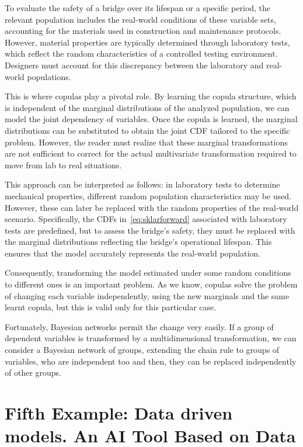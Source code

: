 \documentclass[
	11pt, %
	fleqn, %
	a4paper, %
]{LegrandOrangeBook}
\begin{document}
To evaluate the safety of a bridge over its lifespan or a specific period, the relevant population includes the real-world conditions of these variable sets, accounting for the materials used in construction and maintenance protocols. However, material properties are typically determined through laboratory tests, which reflect the random characteristics of a controlled testing environment. Designers must account for this discrepancy between the laboratory and real-world populations.

This is where copulas play a pivotal role. By learning the copula structure, which is independent of the marginal distributions of the analyzed population, we can model the joint dependency of variables. Once the copula is learned, the marginal distributions can be substituted to obtain the joint CDF tailored to the specific problem. However, the reader must realize that these marginal transformations are not sufficient to correct for the actual multivariate transformation required to move from lab to real situations.

This approach can be interpreted as follows: in laboratory tests to determine mechanical properties, different random population characteristics may be used. However, these can later be replaced with the random properties of the real-world scenario. Specifically, the CDFs in~\eqref{eq:sklarforward} associated with laboratory tests are predefined, but to assess the bridge's safety, they must be replaced with the marginal distributions reflecting the bridge's operational lifespan. This ensures that the model accurately represents the real-world population.

Consequently, transforming the model estimated under some random conditions to different ones is an important problem. As we know, copulas solve the problem of changing each variable independently, using the new marginals and the same learnt copula, but this is valid only for this particular case.

Fortunately, Bayesian networks permit the change very easily. If a group of dependent variables is transformed by a multidimensional transformation, we can consider a Bayesian network of groups, extending the chain rule to groups of variables, who are independent too and then, they can be replaced independently of other groups.

\chapter{Fifth Example: Data driven models. An AI Tool Based on Data}
\label{ch:newaitool}
\end{document}
